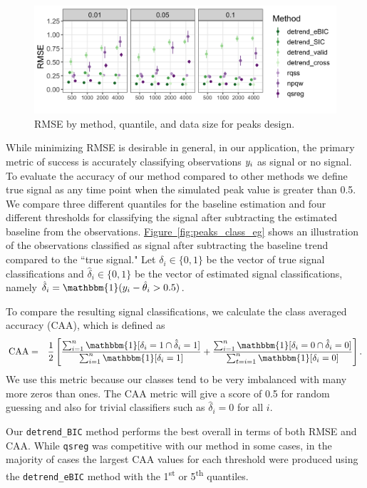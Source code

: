\documentclass[aoas]{imsart}
\newcommand{\Fig}[1]{\hyperref[fig:#1]{Figure~\ref*{fig:#1}}} %
\newcommand{\Fig}[1]{{Figure~\ref{fig:#1}}} %
\newcommand{\One}{\mathbbm{1}}
\newcommand{\VE}[2]{\MakeLowercase{#1}_{#2}} %
\begin{document}
\begin{figure}
	\includegraphics[width = \linewidth]{Figures/peaks_mse.png}
	\caption{RMSE by method, quantile, and data size for peaks design.}
	\label{fig:peaks_rmse}
\end{figure}

While minimizing RMSE is desirable in general, in our application, the primary metric of success is accurately classifying observations $\VE{y}{i}$ as signal or no signal. To evaluate the accuracy of our method compared to other methods we define true signal as any time point when the simulated peak value is greater than 0.5. We compare three different quantiles for the baseline estimation and four different thresholds for classifying the signal after subtracting the estimated baseline from the observations.  \Fig{peaks_class_eg} shows an illustration of the observations classified as signal after subtracting the baseline trend compared to the ``true signal." Let $\delta_i \in \{0,1\}$ be the vector of true signal classifications and $\hat{\delta}_i \in \{0,1\}$ be the vector of estimated signal classifications, namely $\hat{\delta}_i = \One(\VE{y}{i} - \hat{\theta}_{i} > 0.5)$.


To compare the resulting signal classifications, we calculate the class averaged accuracy (CAA), which is defined as
\begin{eqnarray*}
	\mbox{CAA} & = & \frac{1}{2}\left[\frac{\sum_{i=1}^n \One[\delta_i = 1 \cap \hat{\delta}_i = 1]}{\sum_{i=1}^n \One[\delta_i = 1]} + \frac{\sum_{i=1}^n \One[\delta_i = 0 \cap \hat{\delta}_i=0]}{\sum_{t=i=1}^n \One[\delta_i = 0]}\right].
\end{eqnarray*}
We use this metric because our classes tend to be very imbalanced with many more zeros than ones. The CAA metric will give a score of 0.5 for random guessing and also for trivial classifiers such as $\hat{\delta}_i = 0$ for all $i$.

Our \texttt{detrend\_BIC} method performs the best overall in terms of both RMSE and CAA. While \texttt{qsreg} was competitive with our method in some cases, in the majority of cases the largest CAA values for each threshold were produced using the \texttt{detrend\_eBIC} method with the 1\textsuperscript{st} or 5\textsuperscript{th} quantiles.
\end{document}
